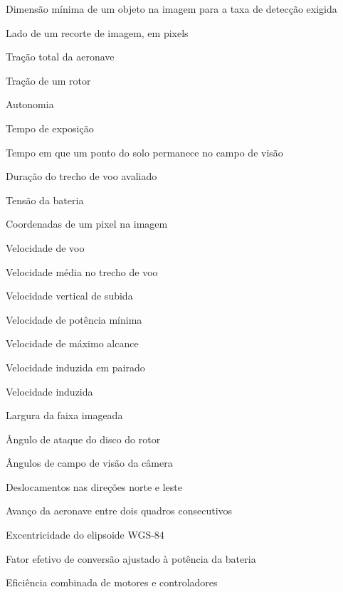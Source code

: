 \begin{simbolos}
  \item[$s_{px,\min}$]             Dimensão mínima de um objeto na imagem para a taxa de detecção exigida
  \item[$s_t$]                     Lado de um recorte de imagem, em pixels
  \item[$T$]                       Tração total da aeronave
  \item[$T_r$]                     Tração de um rotor
  \item[$t_{\mathrm{aut}}$]        Autonomia
  \item[$t_e$]                     Tempo de exposição
  \item[$t_v$]                     Tempo em que um ponto do solo permanece no campo de visão
  \item[$t_{\mathrm{voo}}$] Duração do trecho de voo avaliado
  \item[$U$]                       Tensão da bateria
  \item[$u, v$]                    Coordenadas de um pixel na imagem
  \item[$V$]                       Velocidade de voo
  \item[$\bar V$] Velocidade média no trecho de voo
  \item[$V_c$]                     Velocidade vertical de subida
  \item[$V_{Pmin}$]                Velocidade de potência mínima
  \item[$V_{Rmax}$]                Velocidade de máximo alcance
  \item[$v_h$]                     Velocidade induzida em pairado
  \item[$v_i$]                     Velocidade induzida
  \item[$w$]                       Largura da faixa imageada
  \item[$\alpha_d$]                Ângulo de ataque do disco do rotor
  \item[$\beta_x, \beta_y$]        Ângulos de campo de visão da câmera
  \item[$\Delta N, \Delta E$]      Deslocamentos nas direções norte e leste
  \item[$\Delta x$] Avanço da aeronave entre dois quadros consecutivos
  \item[$\epsilon$]                Excentricidade do elipsoide WGS-84
  \item[$\eta$]                    Fator efetivo de conversão ajustado à potência da bateria
  \item[$\eta_m$]                  Eficiência combinada de motores e controladores

\end{simbolos}
